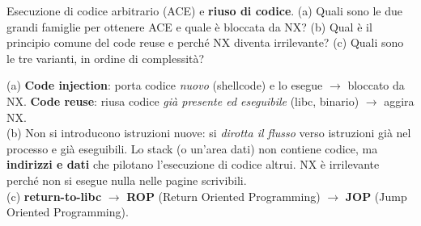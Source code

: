 \question[5]
Esecuzione di codice arbitrario (ACE) e \textbf{riuso di codice}. (a) Quali sono le due grandi famiglie per ottenere ACE e quale è bloccata da NX? (b) Qual è il principio comune del code reuse e perché NX diventa irrilevante? (c) Quali sono le tre varianti, in ordine di complessità?
\begin{solution}
(a) \textbf{Code injection}: porta codice \emph{nuovo} (shellcode) e lo esegue $\to$ bloccato da NX. \textbf{Code reuse}: riusa codice \emph{già presente ed eseguibile} (libc, binario) $\to$ aggira NX.\\
(b) Non si introducono istruzioni nuove: si \emph{dirotta il flusso} verso istruzioni già nel processo e già eseguibili. Lo stack (o un'area dati) non contiene codice, ma \textbf{indirizzi e dati} che pilotano l'esecuzione di codice altrui. NX è irrilevante perché non si esegue nulla nelle pagine scrivibili.\\
(c) \textbf{return-to-libc} $\to$ \textbf{ROP} (Return Oriented Programming) $\to$ \textbf{JOP} (Jump Oriented Programming).
\end{solution}
